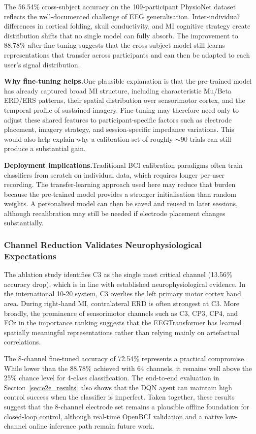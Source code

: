 \documentclass[12pt, a4paper]{article}
\begin{document}
The 56.54\% cross-subject accuracy on the 109-participant PhysioNet dataset reflects the well-documented challenge of EEG generalisation. Inter-individual differences in cortical folding, skull conductivity, and MI cognitive strategy create distribution shifts that no single model can fully absorb. The improvement to 88.78\% after fine-tuning suggests that the cross-subject model still learns representations that transfer across participants and can then be adapted to each user's signal distribution.

\textbf{Why fine-tuning helps.}\quad One plausible explanation is that the pre-trained model has already captured broad MI structure, including characteristic Mu/Beta ERD/ERS patterns, their spatial distribution over sensorimotor cortex, and the temporal profile of sustained imagery. Fine-tuning may therefore need only to adjust these shared features to participant-specific factors such as electrode placement, imagery strategy, and session-specific impedance variations. This would also help explain why a calibration set of roughly $\sim$90 trials can still produce a substantial gain.

\textbf{Deployment implications.}\quad Traditional BCI calibration paradigms often train classifiers from scratch on individual data, which requires longer per-user recording. The transfer-learning approach used here may reduce that burden because the pre-trained model provides a stronger initialisation than random weights. A personalised model can then be saved and reused in later sessions, although recalibration may still be needed if electrode placement changes substantially.

\subsubsection{Channel Reduction Validates Neurophysiological Expectations}

The ablation study identifies C3 as the single most critical channel (13.56\% accuracy drop), which is in line with established neurophysiological evidence. In the international 10-20 system, C3 overlies the left primary motor cortex hand area. During right-hand MI, contralateral ERD is often strongest at C3. More broadly, the prominence of sensorimotor channels such as C3, CP3, CP4, and FCz in the importance ranking suggests that the EEGTransformer has learned spatially meaningful representations rather than relying mainly on artefactual correlations.

The 8-channel fine-tuned accuracy of 72.54\% represents a practical compromise. While lower than the 88.78\% achieved with 64 channels, it remains well above the 25\% chance level for 4-class classification. The end-to-end evaluation in Section~\ref{sec:e2e_results} also shows that the DQN agent can maintain high control success when the classifier is imperfect. Taken together, these results suggest that the 8-channel electrode set remains a plausible offline foundation for closed-loop control, although real-time OpenBCI validation and a native low-channel online inference path remain future work.
\end{document}
